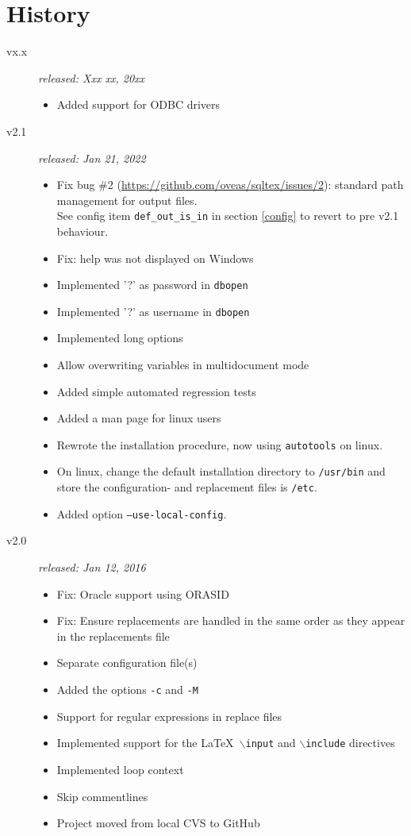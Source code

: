 \documentclass{article}
\newcommand{\bs}{\ensuremath{\backslash}}
\begin{document}
\section{History}

\begin{description}
\item[vx.x] \textit{released: Xxx xx, 20xx}
\begin{itemize}
\item Added support for ODBC drivers
\end{itemize}

\item[v2.1] \textit{released: Jan 21, 2022}
\begin{itemize}
\item Fix bug \#2 (\url{https://github.com/oveas/sqltex/issues/2}): standard path management for output files.\\
See config item \texttt{def\_out\_is\_in} in section \ref{config} to revert to pre v2.1 behaviour.
\item Fix: help was not displayed on Windows
\item Implemented '?' as password in \texttt{dbopen}
\item Implemented '?' as username in \texttt{dbopen}
\item Implemented long options
\item Allow overwriting variables in multidocument mode
\item Added simple automated regression tests
\item Added a man page for linux users
\item Rewrote the installation procedure, now using \texttt{autotools} on linux.
\item On linux, change the default installation directory to \texttt{/usr/bin} and store the configuration- and replacement files is \texttt{/etc}.
\item Added option \texttt{--use-local-config}.
\end{itemize}

\item[v2.0] \textit{released: Jan 12, 2016}
\begin{itemize}
\item Fix: Oracle support using ORASID
\item Fix: Ensure replacements are handled in the same order as they appear in the replacements file
\item Separate configuration file(s)
\item Added the options \texttt{-c} and \texttt{-M}
\item Support for regular expressions in replace files
\item Implemented support for the \LaTeX\ \texttt{\bs input} and \texttt{\bs include} directives
\item Implemented loop context
\item Skip commentlines
\item Project moved from local CVS to GitHub
\end{itemize}


\end{description}
\end{document}
